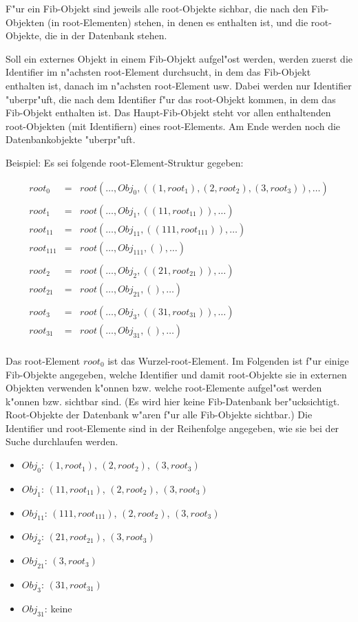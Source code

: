 F"ur ein Fib-Objekt sind jeweils alle root-Objekte sichbar, die nach den Fib-Objekten (in root-Elementen) stehen, in denen es enthalten ist, und die root-Objekte, die in der Datenbank stehen.

Soll ein externes Objekt  in einem Fib-Objekt aufgel"ost werden, werden zuerst die Identifier im n"achsten root-Element durchsucht, in dem das Fib-Objekt enthalten ist, danach im n"achsten root-Element usw. Dabei werden nur Identifier "uberpr"uft, die nach dem Identifier f"ur das root-Objekt kommen, in dem das Fib-Objekt enthalten ist. Das Haupt-Fib-Objekt steht vor allen enthaltenden root-Objekten (mit Identifiern) eines root-Elements. Am Ende werden noch die Datenbankobjekte "uberpr"uft.

\bigskip\noindent
Beispiel: Es sei folgende root-Element-Struktur gegeben:

\begin{eqnarray*}
root_0&=&root( \ldots , Obj_0 , (( 1, root_1), ( 2, root_2), ( 3, root_3)), \ldots )\\
\\
root_1&=&root( \ldots , Obj_1 , (( 11, root_{11})),  \ldots )\\
root_{11}&=&root( \ldots , Obj_{11} , (( 111, root_{111})), \ldots )\\
root_{111}&=&root( \ldots , Obj_{111} , (), \ldots )\\
\\
root_2&=&root( \ldots , Obj_2 , (( 21, root_{21})),  \ldots )\\
root_{21}&=&root( \ldots , Obj_{21} , (), \ldots )\\
\\
root_3&=&root( \ldots , Obj_3 , (( 31, root_{31})),  \ldots )\\
root_{31}&=&root( \ldots , Obj_{31} , (), \ldots )\\
\end{eqnarray*}

Das root-Element $root_0$ ist das Wurzel-root-Element.
Im Folgenden ist f"ur einige Fib-Objekte angegeben, welche Identifier und damit root-Objekte sie in externen Objekten verwenden k"onnen bzw. welche root-Elemente aufgel"ost werden k"onnen bzw. sichtbar sind. (Es wird hier keine Fib-Datenbank ber"ucksichtigt. Root-Objekte der Datenbank w"aren f"ur alle Fib-Objekte sichtbar.) Die Identifier und root-Elemente sind in der Reihenfolge angegeben, wie sie bei der Suche durchlaufen werden.
\begin{itemize}
 \item $Obj_0$: $( 1, root_1)$, $( 2, root_2)$, $( 3, root_3)$
 \item $Obj_1$: $( 11, root_{11})$, $( 2, root_2)$, $( 3, root_3)$
 \item $Obj_{11}$: $( 111, root_{111})$, $( 2, root_2)$, $( 3, root_3)$
 \item $Obj_2$: $( 21, root_{21})$, $( 3, root_3)$
 \item $Obj_{21}$: $( 3, root_3)$
 \item $Obj_3$: $( 31, root_{31})$
 \item $Obj_{31}$: keine
\end{itemize}

